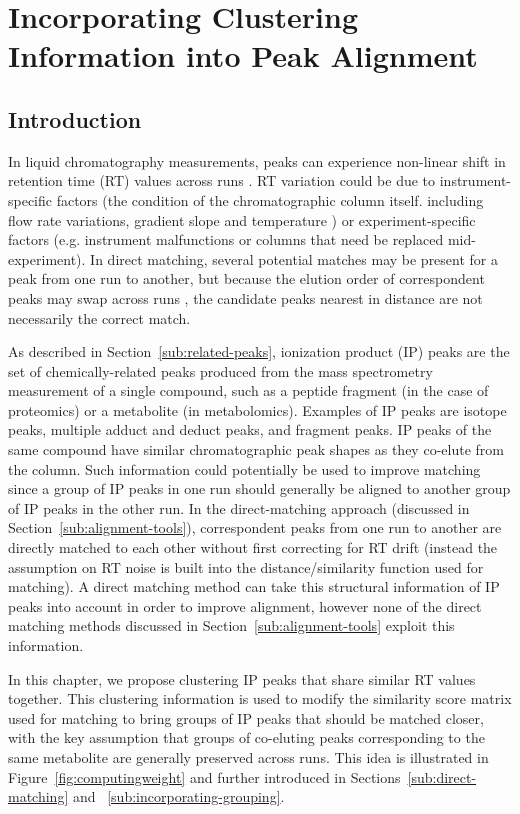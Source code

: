 \chapter{Incorporating Clustering Information into Peak Alignment}
\label{c:matching}

\section{Introduction}

In liquid chromatography measurements, peaks can experience non-linear shift in retention time (RT) values across runs \cite{Podwojski2009}. RT variation could be due to instrument-specific factors (the condition of the chromatographic column itself. including flow rate variations, gradient slope and temperature \cite{Christin2008}) or experiment-specific factors (e.g. instrument malfunctions or columns that need be replaced mid-experiment). In direct matching, several potential matches may be present for a peak from one run to another, but because the elution order of correspondent peaks may swap across runs \cite{Smith2013}, the candidate peaks nearest in distance are not necessarily the correct match.

As described in Section~\ref{sub:related-peaks}, ionization product (IP) peaks are the set of chemically-related peaks produced from the mass spectrometry measurement of a single compound, such as a peptide fragment (in the case of proteomics) or a metabolite (in metabolomics). Examples of IP peaks are isotope peaks, multiple adduct and deduct peaks, and fragment peaks. IP peaks of the same compound have similar chromatographic peak shapes as they co-elute from the column. Such information could potentially be used to improve matching since a group of IP peaks in one run should generally be aligned to another group of IP peaks in the other run. In the direct-matching approach (discussed in Section~\ref{sub:alignment-tools}), correspondent peaks from one run to another are directly matched to each other without first correcting for RT drift (instead the assumption on RT noise is built into the distance/similarity function used for matching). A direct matching method can take this structural information of IP peaks into account in order to improve alignment, however none of the direct matching methods discussed in Section~\ref{sub:alignment-tools} exploit this information.

In this chapter, we propose clustering IP peaks that share similar RT values together. This clustering information is used to modify the similarity score matrix used for matching to bring groups of IP peaks that should be matched closer, with the key assumption that groups of co-eluting peaks corresponding to the same metabolite are generally preserved across runs. This idea is illustrated in Figure~\ref{fig:computingweight} and further introduced in Sections~\ref{sub:direct-matching} and ~\ref{sub:incorporating-grouping}.  

